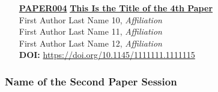 \begin{enumerate}
\item[\href{https://doi.org/10.1145/1111111.1111115}{\textbf{PAPER004}}]
\href{https://doi.org/10.1145/1111111.1111115}{\textbf{This Is the Title of the 4th Paper}}\\
First Author Last Name 10, \emph{Affiliation}\\
First Author Last Name 11, \emph{Affiliation}\\
First Author Last Name 12, \emph{Affiliation}\\
\textbf{DOI:} \href{https://doi.org/10.1145/1111111.1111115}{https://doi.org/10.1145/1111111.1111115}\\
\end{enumerate}

\subsubsection{Name of the Second Paper Session}
